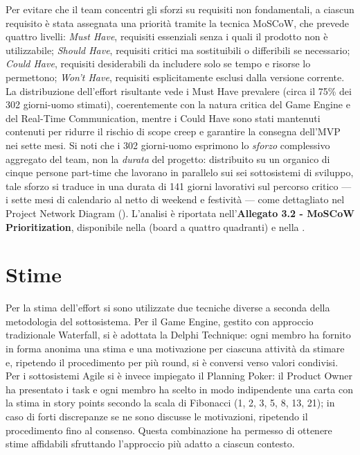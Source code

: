 Per evitare che il team concentri gli sforzi su requisiti non fondamentali, a ciascun requisito è stata assegnata una priorità tramite la tecnica MoSCoW, che prevede quattro livelli: \textit{Must Have}, requisiti essenziali senza i quali il prodotto non è utilizzabile; \textit{Should Have}, requisiti critici ma sostituibili o differibili se necessario; \textit{Could Have}, requisiti desiderabili da includere solo se tempo e risorse lo permettono; \textit{Won't Have}, requisiti esplicitamente esclusi dalla versione corrente. La distribuzione dell'effort risultante vede i Must Have prevalere (circa il 75\% dei 302 giorni-uomo stimati), coerentemente con la natura critica del Game Engine e del Real-Time Communication, mentre i Could Have sono stati mantenuti contenuti per ridurre il rischio di scope creep e garantire la consegna dell'MVP nei sette mesi. Si noti che i 302 giorni-uomo esprimono lo \textit{sforzo} complessivo aggregato del team, non la \textit{durata} del progetto: distribuito su un organico di cinque persone part-time che lavorano in parallelo sui sei sottosistemi di sviluppo, tale sforzo si traduce in una durata di 141 giorni lavorativi sul percorso critico --- i sette mesi di calendario al netto di weekend e festività --- come dettagliato nel Project Network Diagram (). L'analisi è riportata nell'\textbf{Allegato 3.2 - MoSCoW Prioritization}, disponibile nella  (board a quattro quadranti) e nella .

\section{Stime}

Per la stima dell'effort si sono utilizzate due tecniche diverse a seconda della metodologia del sottosistema. Per il Game Engine, gestito con approccio tradizionale Waterfall, si è adottata la Delphi Technique: ogni membro ha fornito in forma anonima una stima e una motivazione per ciascuna attività da stimare e, ripetendo il procedimento per più round, si è conversi verso valori condivisi. Per i sottosistemi Agile si è invece impiegato il Planning Poker: il Product Owner ha presentato i task e ogni membro ha scelto in modo indipendente una carta con la stima in story points secondo la scala di Fibonacci (1, 2, 3, 5, 8, 13, 21); in caso di forti discrepanze se ne sono discusse le motivazioni, ripetendo il procedimento fino al consenso. Questa combinazione ha permesso di ottenere stime affidabili sfruttando l'approccio più adatto a ciascun contesto.

